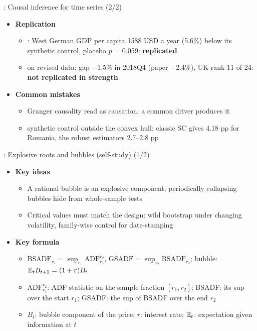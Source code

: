 \begin{frame}{: Causal inference for time series (2/2)}
\itemsize{\small}
\begin{itemize}
    \item \textbf{Replication}
    \begin{itemize}
        \item {}: West German GDP per capita 1588 USD a year (5.6\%) below its synthetic control, placebo $p$ = 0.059: \textbf{replicated}
        \item {} on revised data: gap $-$1.5\% in 2018Q4 (paper $-$2.4\%), UK rank 11 of 24: \textbf{not replicated in strength}
    \end{itemize}
    \item \textbf{Common mistakes}
    \begin{itemize}
        \item Granger causality read as causation; a common driver produces it
        \item synthetic control outside the convex hull: classic SC gives 4.18 pp for Romania, the robust estimators 2.7--2.8 pp
    \end{itemize}
\end{itemize}
\end{frame}

\begin{frame}{: Explosive roots and bubbles (self-study) (1/2)}
\itemsize{\footnotesize}
\begin{itemize}
    \item \textbf{Key ideas}
    \begin{itemize}
        \item A rational bubble is an explosive component; periodically collapsing bubbles hide from whole-sample tests
        \item Critical values must match the design: wild bootstrap under changing volatility, family-wise control for date-stamping
    \end{itemize}
    \item \textbf{Key formula}
    \begin{itemize}
        \item $\mathrm{BSADF}_{r_2} = \sup_{r_1}\mathrm{ADF}_{r_1}^{r_2}$, $\mathrm{GSADF} = \sup_{r_2}\mathrm{BSADF}_{r_2}$; bubble: $\mathbb{E}_tB_{t+1} = (1 + r)B_t$
        \item $\mathrm{ADF}_{r_1}^{r_2}$: ADF statistic on the sample fraction $[r_1, r_2]$; BSADF: its sup over the start $r_1$; GSADF: the sup of BSADF over the end $r_2$
        \item $B_t$: bubble component of the price; $r$: interest rate; $\mathbb{E}_t$: expectation given information at $t$
    \end{itemize}
\end{itemize}
\end{frame}

